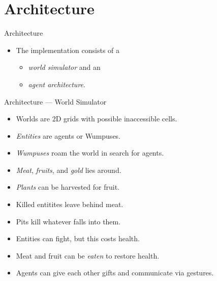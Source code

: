 \documentclass{beamer}
\begin{document}
   \section{Architecture}
   
   \begin{frame}{Architecture}
       \begin{itemize}
          \item The implementation consists of a
             \begin{itemize}
                \item \emph{world simulator} and an
                \item \emph{agent architecture}.
             \end{itemize}
       \end{itemize}
   \end{frame}
   
   \begin{frame}{Architecture --- World Simulator}
      \begin{itemize}
         \item Worlds are 2D grids with possible inaccessible cells.
         \item \emph{Entities} are agents or Wumpuses.
         \item \emph{Wumpuses} roam the world in search for agents.
       \item \emph{Meat}, \emph{fruits}, and \emph{gold} lies around.
         \item \emph{Plants} can be harvested for fruit.
         \item Killed entitites leave behind meat.
         
         \vspace{2mm}
         \item Pits kill whatever falls into them.
         \vspace{2mm}
         \item Entities can fight, but this costs health.
         \item Meat and fruit can be \emph{eaten} to restore health.
         \item Agents can give each other gifts and communicate via gestures.
      \end{itemize}
   \end{frame}
   
\end{document}
